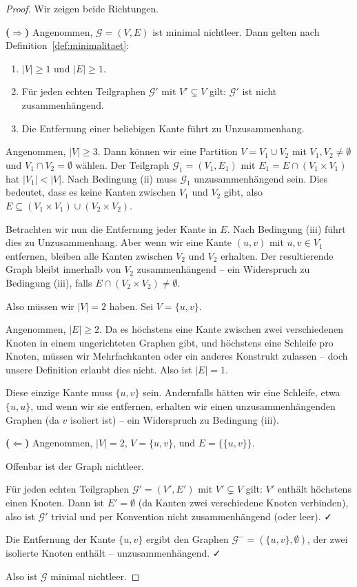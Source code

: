 \documentclass[12pt, a4paper]{article}
\theoremstyle{definition}
\theoremstyle{remark}
\newcommand{\Graph}{\mathcal{G}}
\begin{document}
\begin{proof}
Wir zeigen beide Richtungen.

\textbf{($\Rightarrow$)} Angenommen, $\Graph = (V, E)$ ist minimal nichtleer. Dann gelten nach Definition~\ref{def:minimalitaet}:
\begin{enumerate}[label=(\roman*)]
  \item $|V| \geq 1$ und $|E| \geq 1$.
  \item Für jeden echten Teilgraphen $\Graph'$ mit $V' \subsetneq V$ gilt: $\Graph'$ ist nicht zusammenhängend.
  \item Die Entfernung einer beliebigen Kante führt zu Unzusammenhang.
\end{enumerate}

Angenommen, $|V| \geq 3$. Dann können wir eine Partition $V = V_1 \cup V_2$ mit $V_1, V_2 \neq \emptyset$ und $V_1 \cap V_2 = \emptyset$ wählen. Der Teilgraph $\Graph_1 = (V_1, E_1)$ mit $E_1 = E \cap (V_1 \times V_1)$ hat $|V_1| < |V|$. Nach Bedingung (ii) muss $\Graph_1$ unzusammenhängend sein. Dies bedeutet, dass es keine Kanten zwischen $V_1$ und $V_2$ gibt, also $E \subseteq (V_1 \times V_1) \cup (V_2 \times V_2)$.

Betrachten wir nun die Entfernung jeder Kante in $E$. Nach Bedingung (iii) führt dies zu Unzusammenhang. Aber wenn wir eine Kante $(u, v)$ mit $u, v \in V_1$ entfernen, bleiben alle Kanten zwischen $V_2$ und $V_2$ erhalten. Der resultierende Graph bleibt innerhalb von $V_2$ zusammenhängend -- ein Widerspruch zu Bedingung (iii), falls $E \cap (V_2 \times V_2) \neq \emptyset$.

Also müssen wir $|V| = 2$ haben. Sei $V = \{u, v\}$.

Angenommen, $|E| \geq 2$. Da es höchstens eine Kante zwischen zwei verschiedenen Knoten in einem ungerichteten Graphen gibt, und höchstens eine Schleife pro Knoten, müssen wir Mehrfachkanten oder ein anderes Konstrukt zulassen -- doch unsere Definition erlaubt dies nicht. Also ist $|E| = 1$.

Diese einzige Kante muss $\{u, v\}$ sein. Andernfalls hätten wir eine Schleife, etwa $\{u, u\}$, und wenn wir sie entfernen, erhalten wir einen unzusammenhängenden Graphen (da $v$ isoliert ist) -- ein Widerspruch zu Bedingung (iii).

\textbf{($\Leftarrow$)} Angenommen, $|V| = 2$, $V = \{u, v\}$, und $E = \{\{u, v\}\}$. 

Offenbar ist der Graph nichtleer.

Für jeden echten Teilgraphen $\Graph' = (V', E')$ mit $V' \subsetneq V$ gilt: $V'$ enthält höchstens einen Knoten. Dann ist $E' = \emptyset$ (da Kanten zwei verschiedene Knoten verbinden), also ist $\Graph'$ trivial und per Konvention nicht zusammenhängend (oder leer). ✓

Die Entfernung der Kante $\{u, v\}$ ergibt den Graphen $\Graph^- = (\{u, v\}, \emptyset)$, der zwei isolierte Knoten enthält -- unzusammenhängend. ✓

Also ist $\Graph$ minimal nichtleer.
\end{proof}
\end{document}

